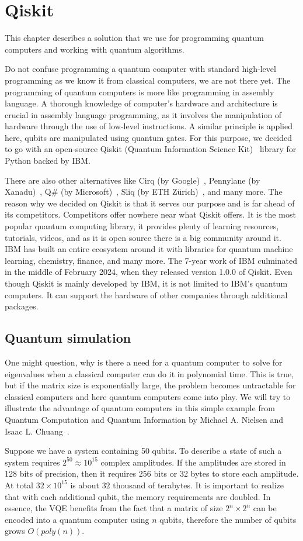 \chapter{Qiskit}\label{ch:qiskit}
This chapter describes a solution that we use for programming quantum computers and working with quantum algorithms. 

Do not confuse programming a quantum computer with standard high-level programming as we know it from classical computers, we are not there yet. The programming of quantum computers is more like programming in assembly language. A thorough knowledge of computer's hardware and architecture is crucial in assembly language programming, as it involves the manipulation of hardware through the use of low-level instructions. A similar principle is applied here, qubits are manipulated using quantum gates. For this purpose, we decided to go with an open-source Qiskit (Quantum Information Science Kit)~\cite{qiskit} library for Python backed by IBM.

There are also other alternatives like Cirq (by Google)~\cite{cirq}, Pennylane (by Xanadu)~\cite{pennylane}, Q\# (by Microsoft)~\cite{qsharp}, Sliq (by ETH Zürich)~\cite{sliq}, and many more. The reason why we decided on Qiskit is that it serves our purpose and is far ahead of its competitors. Competitors offer nowhere near what Qiskit offers. It is the most popular quantum computing library, it provides plenty of learning resources, tutorials, videos, and as it is open source there is a big community around it. IBM has built an entire ecosystem around it \cite{qiskit_ecosystem} with libraries for quantum machine learning, chemistry, finance, and many more. The 7-year work of IBM culminated in the middle of February 2024, when they released version 1.0.0 of Qiskit. Even though Qiskit is mainly developed by IBM, it is not limited to IBM's quantum computers. It can support the hardware of other companies through additional packages.

\section{Quantum simulation}
One might question, why is there a need for a quantum computer to solve for eigenvalues when a classical computer can do it in polynomial time. This is true, but if the matrix size is exponentially large, the problem becomes untractable for classical computers and here quantum computers come into play. We will try to illustrate the advantage of quantum computers in this simple example from Quantum Computation and Quantum Information by Michael A. Nielsen and Isaac L. Chuang~\cite{qc}.

Suppose we have a system containing 50 qubits. To describe a state of such a system requires $2^{50} \approx 10^{15}$ complex amplitudes. If the amplitudes are stored in 128 bits of precision, then it requires 256 bits or 32 bytes to store each amplitude. At total $32 \times 10^{15}$ is about $32$ thousand of terabytes. It is important to realize that with each additional qubit, the memory requirements are doubled. In essence, the VQE benefits from the fact that a matrix of size $2^n \times 2^n$ can be encoded into a quantum computer using $n$ qubits, therefore the number of qubits grows $O(poly(n))$.